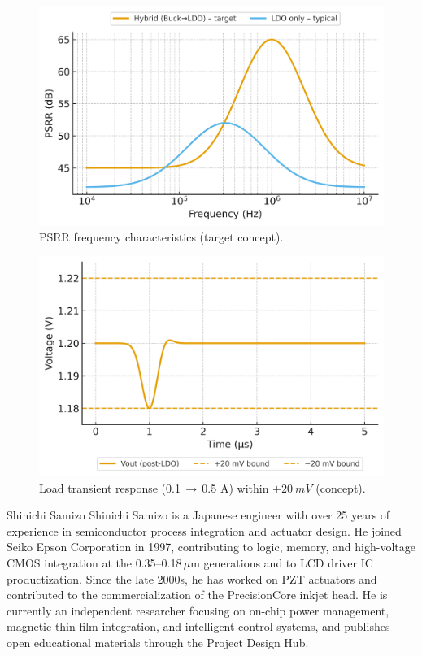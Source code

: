 \documentclass[journal]{IEEEtran}
\begin{document}
\begin{figure}[!t]
\centering
\includegraphics[width=0.8\linewidth]{fig/fig4_psrr_target.png}
\caption{PSRR frequency characteristics (target concept).}
\label{fig4}
\end{figure}

\begin{figure}[!t]
\centering
\includegraphics[width=0.8\linewidth]{fig/fig5_transient_response.png}
\caption{Load transient response (0.1\,$\to$\,0.5 A) within $\pm\SI{20}{mV}$ (concept).}
\label{fig5}
\end{figure}

\begin{IEEEbiography}{Shinichi Samizo}
Shinichi Samizo is a Japanese engineer with over 25 years of experience in semiconductor process integration and actuator design. He joined Seiko Epson Corporation in 1997, contributing to logic, memory, and high-voltage CMOS integration at the 0.35--0.18\,$\mu$m generations and to LCD driver IC productization. Since the late 2000s, he has worked on PZT actuators and contributed to the commercialization of the PrecisionCore inkjet head. He is currently an independent researcher focusing on on-chip power management, magnetic thin-film integration, and intelligent control systems, and publishes open educational materials through the Project Design Hub.
\end{IEEEbiography}
\end{document}
